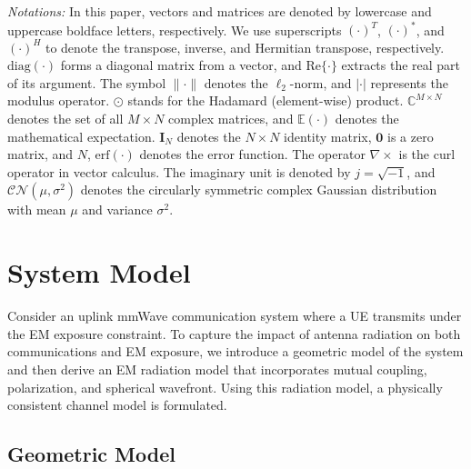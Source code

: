 \documentclass[journal]{IEEEtran}
\begin{document}
\textit{Notations:} In this paper, vectors and matrices are denoted by lowercase and uppercase boldface letters, respectively. We use superscripts $(\cdot)^T$, $(\cdot)^*$, and $(\cdot)^H$ to denote the transpose, inverse, and Hermitian transpose, respectively. $\mathrm{diag}(\cdot)$ forms a diagonal matrix from a vector, and $\mathrm{Re}\{\cdot\}$ extracts the real part of its argument. The symbol $\|\cdot\|$ denotes the $\ell_2$-norm, and $|\cdot|$ represents the modulus operator. $\odot$ stands for the Hadamard (element-wise) product. $\mathbb{C}^{M \times N}$ denotes the set of all $M \times N$ complex matrices, and $\mathbb{E}(\cdot)$ denotes the mathematical expectation. $\mathbf{I}_N$ denotes the $N \times N$ identity matrix, $\mathbf{0}$ is a zero matrix, and $N$, $\mathrm{erf}(\cdot)$ denotes the error function. The operator $\nabla \times$ is the curl operator in vector calculus. The imaginary unit is denoted by $j = \sqrt{-1}$, and $\mathcal{CN}(\mu, \sigma^2)$ denotes the circularly symmetric complex Gaussian distribution with mean $\mu$ and variance $\sigma^2$.


\section{System Model}
\label{sec:system}

Consider an uplink mmWave communication system where a UE transmits under the EM exposure constraint. To capture the impact of antenna radiation on both communications and EM exposure, we introduce a geometric model of the system and then derive an EM radiation model that incorporates mutual coupling, polarization, and spherical wavefront. Using this radiation model, a physically consistent channel model is formulated.

\subsection{Geometric Model}
\end{document}
